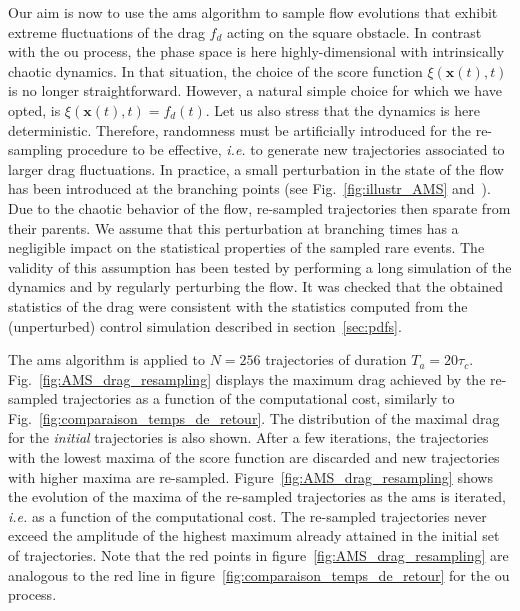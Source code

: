 \documentclass[pre,aps,floatfix,10pt,superscriptaddress, notitlepage,preprint]{revtex4-1}
\newcommand{\EL}[1]{{\color{myred}{#1}}}
\begin{document}
%
%
Our aim is now to use the \ac{ams} algorithm to sample flow evolutions that exhibit extreme fluctuations of the drag $f_d$ acting on the square obstacle.
In contrast with the \acl{ou} process, the phase space is here highly-dimensional with intrinsically chaotic dynamics.
In that situation, the choice of the score function $\xi (\mathbf{x}(t),t)$ is no longer straightforward.
However, a natural simple choice for which we have opted, is $\xi (\mathbf{x}(t),t) = f_d(t)$. 
%
{Let us also stress that the dynamics is here deterministic.
Therefore, randomness must be artificially introduced for the re-sampling procedure to be effective, \textit{i.e.} to generate new trajectories associated to larger drag fluctuations.
In practice, a small perturbation in the state of the flow has been introduced at the branching points (see Fig.~\ref{fig:illustr_AMS} and~\cite{wouters2016rare}).
%
Due to the chaotic behavior of the flow, re-sampled trajectories then sparate from their parents.
We assume that this perturbation at branching times has a negligible impact on the statistical properties of the sampled rare events.
The validity of this assumption has been tested by performing a long simulation of the dynamics and by regularly perturbing the flow.
It was checked that the obtained statistics of the drag were consistent with the statistics computed from the (unperturbed) control simulation described in section~\ref{sec:pdfs}.}


%
The \ac{ams} algorithm is applied to $N=256$ trajectories of duration $T_a = 20\tau_c$.
%
Fig.~\ref{fig:AMS_drag_resampling} displays the maximum drag achieved by the re-sampled trajectories as a function of the computational cost, similarly to Fig.~\ref{fig:comparaison_temps_de_retour}.
%
%
The distribution of the maximal drag for the \textit{initial} trajectories is also shown.
After a few iterations, the trajectories with the lowest maxima of the score function are discarded and new trajectories with higher maxima are re-sampled.
Figure~\ref{fig:AMS_drag_resampling} shows the evolution of the maxima of the re-sampled trajectories as the \ac{ams} is iterated, \textit{i.e.} as a function of the computational cost.
The re-sampled trajectories never exceed the amplitude of the highest maximum already attained in the initial set of trajectories.
Note that the red points in figure~\ref{fig:AMS_drag_resampling} are analogous to the red line in  figure~\ref{fig:comparaison_temps_de_retour} for the \ac{ou} process.
\end{document}
